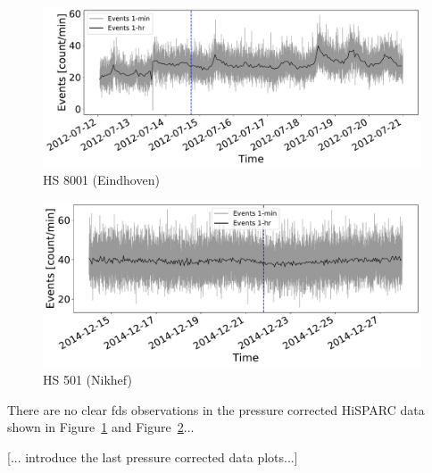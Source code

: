 \begin{figure}[ht]
	\centering
	\includegraphics[width=0.65\columnwidth]{FD_201207_8001_Pcorr.pdf}
	\caption{HS 8001 (Eindhoven)}
	\label{fig:FD_201207_8001_Pcorr}
\end{figure}



\begin{figure}[ht]
	\centering
	\includegraphics[width=0.65\columnwidth]{FD_201412_501_Pcorr.pdf}
	\caption{HS 501 (Nikhef)}
	\label{fig:FD_201412_501_Pcorr}
\end{figure}


There are no clear \glspl{fd} observations in the pressure corrected HiSPARC data shown in Figure~\ref{fig:FD_201207_8001_Pcorr} and Figure~\ref{fig:FD_201412_501_Pcorr}...

[... introduce the last pressure corrected data plots...]

